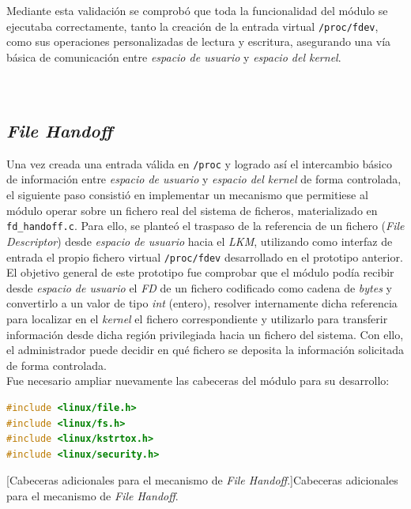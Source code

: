 Mediante esta validación se comprobó que toda la funcionalidad del módulo se ejecutaba correctamente, tanto la creación de la entrada virtual \texttt{/proc/fdev}, como sus operaciones personalizadas de lectura y escritura, asegurando una vía básica de comunicación entre \textit{espacio de usuario} y \textit{espacio del kernel}.\\\\

\

\subsection{\textit{File Handoff}}
\label{sec:proto-file-handoff}

Una vez creada una entrada válida en \texttt{/proc} y logrado así el intercambio básico de información entre \textit{espacio de usuario} y \textit{espacio del kernel} de forma controlada, el siguiente paso consistió en implementar un mecanismo que permitiese al módulo operar sobre un fichero real del sistema de ficheros, materializado en \verb|fd_handoff.c|.
Para ello, se planteó el traspaso de la referencia de un fichero (\textit{File Descriptor}) desde \textit{espacio de usuario} hacia el \textit{LKM}, utilizando como interfaz de entrada el propio fichero virtual \texttt{/proc/fdev} desarrollado en el prototipo anterior.\\

El objetivo general de este prototipo fue comprobar que el módulo podía recibir desde \textit{espacio de usuario} el \textit{FD} de un fichero codificado como cadena de \textit{bytes} y convertirlo a un valor de tipo \textit{int} (entero), resolver internamente dicha referencia para localizar en el \textit{kernel} el fichero correspondiente y utilizarlo para transferir información desde dicha región privilegiada hacia un fichero del sistema.
Con ello, el administrador puede decidir en qué fichero se deposita la información solicitada de forma controlada.\\

Fue necesario ampliar nuevamente las cabeceras del módulo para su desarrollo:

\begin{lstlisting}[language=C]
#include <linux/file.h>
#include <linux/fs.h>
#include <linux/kstrtox.h>
#include <linux/security.h>
\end{lstlisting}
\captionsetup{type=code,justification=centering,singlelinecheck=false}
[Cabeceras adicionales para el mecanismo de \textit{File Handoff}.]{Cabeceras adicionales para el mecanismo de \textit{File Handoff}.}
\label{cod:file_handoff_headers}
\vspace{\baselineskip}

